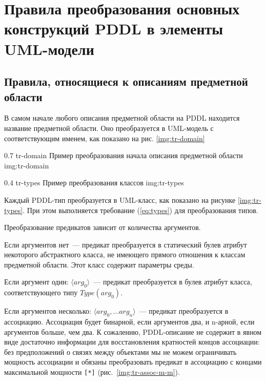 \section{Правила преобразования основных конструкций PDDL в элементы UML-модели}

\subsection{Правила, относящиеся к описаниям предметной области}
    
В самом начале любого описания предметной области на PDDL находится название предметной области.
Оно преобразуется в UML-модель с соответствующим именем, как показано на рис. \ref{img:tr-domain} 

{0.7}
{tr-domain}
{Пример преобразования начала описания предметной области}
{img:tr-domain}


{0.4}
{tr-types}
{Пример преобразования классов}
{img:tr-types}

Каждый PDDL-тип преобразуется в UML-класс, как показано на рисунке \ref{img:tr-types}. При этом выполняется требование (\ref{eq:types}) для преобразования типов.

Преобразование предикатов зависит от количества аргументов.

Если аргументов нет~--- предикат преобразуется в статический булев атрибут некоторого абстрактного класса, не имеющего прямого отношения к классам предметной области.  Этот класс содержит параметры среды.

Если аргумент один: $\langle arg_0 \rangle$~--- предикат преобразуется в булев атрибут класса, соответствующего типу $Type(arg_0)$.

Если аргументов несколько: $\langle arg_0, \ldots arg_n \rangle$~--- предикат преобразуется в ассоциацию. 
Ассоциация будет бинарной, если аргументов два, и n-арной, если аргументов больше, чем два. 
К сожалению, PDDL-описание не содержит в явном виде достаточно информации для восстановления кратностей концов ассоциации: без предположений о связях между объектами мы не можем ограничивать мощность ассоциации и обязаны преобразовать предикат в ассоциацию с концами максимальной мощности \texttt{[*]} (рис.~\ref{img:tr-assoc-m-m}). 

